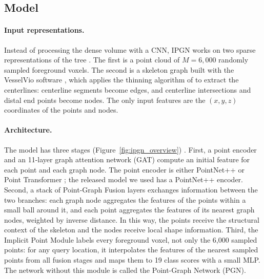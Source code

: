 \subsection{Model}                       %
\label{sec:labeling_architecture}        %

\paragraph{Input representations.}       %
Instead of processing the dense volume with a CNN, IPGN works on two sparse representations
of the tree \cite{xie2025}. The first is a point cloud of $M = 6{,}000$ randomly sampled
foreground voxels. The second is a skeleton graph built with the VesselVio software
\cite{bumgarner2022}, which applies the thinning algorithm of \citet{lee1994} to extract the
centerlines: centerline segments become edges, and centerline intersections and distal end
points become nodes. The only input features are the $(x, y, z)$ coordinates of the points
and nodes.

\paragraph{Architecture.}                %
The model has three stages (Figure~\ref{fig:ipgn_overview}) \cite{xie2025}. First, a point
encoder and an 11-layer graph attention network (GAT) \cite{velickovic2018} compute an
initial feature for each point and each graph node. The point encoder is either
PointNet++ \cite{qi2017} or Point Transformer \cite{zhao2021}; the released model we used has
a PointNet++ encoder. Second, a stack of Point-Graph Fusion layers
exchanges information between the two branches: each graph node aggregates the features of
the points within a small ball around it, and each point aggregates the features of its
nearest graph nodes, weighted by inverse distance. In this way, the points receive the
structural context of the skeleton and the nodes receive local shape information. Third,
the Implicit Point Module labels every foreground voxel, not only the 6,000 sampled points:
for any query location, it interpolates the features of the nearest sampled points from all
fusion stages and maps them to 19 class scores with a small MLP. The network without this
module is called the Point-Graph Network (PGN).


